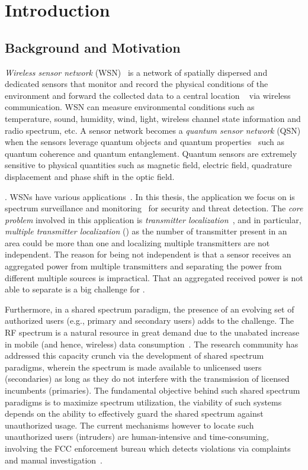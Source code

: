 \chapter{Introduction}
\label{chap:intro}

\section{Background and Motivation}

\emph{Wireless sensor network} (WSN)~\cite{wsn_survey} is a network of spatially dispersed and dedicated sensors that monitor and record the 
physical conditions of the environment and forward the collected data to a central location ~\cite{wsn_wiki} via wireless communication.
WSN can measure environmental conditions such as temperature, sound, humidity, wind, light, wireless channel state information and radio spectrum, etc.
A sensor network becomes a \emph{quantum sensor network} (QSN) when the sensors leverage quantum objects and quantum properties~\cite{RevModPhys.quantumsensing}
such as quantum coherence and quantum entanglement.
Quantum sensors are extremely sensitive to physical quantities such as magnetic field, electric field, quadrature displacement
and phase shift in the optic field.

. WSNs have various applications~\cite{tsn17-water,sensys10-health,mobicom03-sensor}.
In this thesis, the application we focus on is spectrum surveillance and monitoring~\cite{arani2018} for security and threat detection.
The \emph{core problem} involved in this application is \emph{transmitter localization}~\cite{ton-sensorselect,caitao2023qsn},
 and in particular, \emph{multiple transmitter localization} (\mtl) as 
the number of transmitter present in an area could be more than one and localizing multiple transmitters are not independent.
The reason for being not independent is that a sensor receives an aggregated power from multiple transmitters and separating 
the power from different multiple sources is impractical.
That an aggregated received power is not able to separate is a big challenge for \mtl.

Furthermore, in a shared spectrum paradigm, the presence of an evolving set of authorized users 
(e.g., primary and secondary users) adds to the challenge.
The RF spectrum is a natural resource in great demand due to the unabated increase in mobile (and hence, wireless) data consumption~\cite{Jeffrey14}. 
The research community has addressed this capacity crunch via the development of shared spectrum paradigms, wherein the spectrum 
is made available to unlicensed users (secondaries) as long as they do not interfere with the transmission of licensed incumbents (primaries).
The fundamental objective behind such shared spectrum paradigms is to maximize spectrum utilization,
the viability of such systems depends on the ability to effectively guard the shared spectrum against unauthorized usage. 
The current mechanisms however to locate such unauthorized users (intruders) are human-intensive and time-consuming, 
involving the FCC enforcement bureau which detects violations via complaints and manual investigation~\cite{mobicom17-splot}. 


